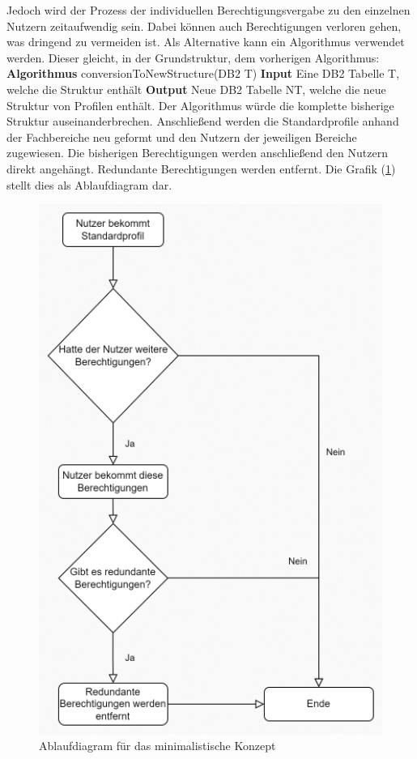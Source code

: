 Jedoch wird der Prozess der individuellen Berechtigungsvergabe zu den einzelnen Nutzern zeitaufwendig sein.
Dabei können auch Berechtigungen verloren gehen, was dringend zu vermeiden ist.
\newline
Als Alternative kann ein Algorithmus verwendet werden.
Dieser gleicht, in der Grundstruktur, dem vorherigen Algorithmus:
\newline
\newline
\textbf{Algorithmus} conversionToNewStructure(DB$2$ T)
\newline
\newline
\textbf{Input} Eine DB2 Tabelle T, welche die Struktur enthält
\newline
\newline
\textbf{Output} Neue DB2 Tabelle NT, welche die neue Struktur von Profilen enthält.
\newline
\newline
Der Algorithmus würde die komplette bisherige Struktur auseinanderbrechen.
Anschließend werden die Standardprofile anhand der Fachbereiche neu geformt und den Nutzern der jeweiligen Bereiche zugewiesen.
Die bisherigen Berechtigungen werden anschließend den Nutzern direkt angehängt.
Redundante Berechtigungen werden entfernt.
Die Grafik (\ref{fig:Mini}) stellt dies als Ablaufdiagram dar.
\begin{figure}[h!]
 \centering
 \includegraphics[width=1\textwidth]{gfx/Picture/Mini.PNG}
 \caption{Ablaufdiagram für das minimalistische Konzept}
 \label{fig:Mini}
\end{figure}